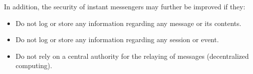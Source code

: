 In addition, the security of instant messengers may further be improved if they:

\begin{itemize}
    \item Do not log or store any information regarding any message or its contents.
    \item Do not log or store any information regarding any session or event.
    \item Do not rely on a central authority for the relaying of messages (decentralized computing).
\end{itemize}


